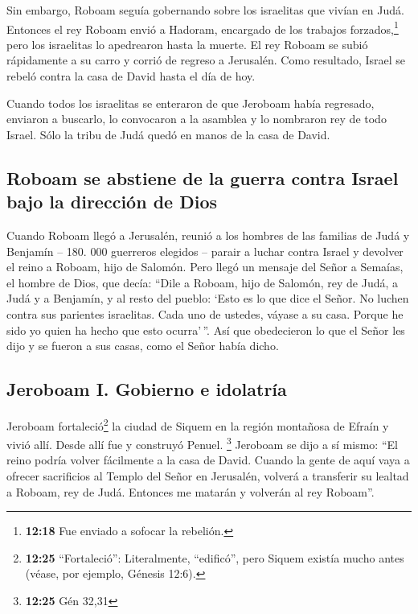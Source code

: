  Sin embargo, Roboam seguía gobernando sobre los
israelitas que vivían en Judá.  Entonces el rey Roboam
envió a Hadoram, encargado de los trabajos forzados,\footnote{\textbf{12:18}
  Fue enviado a sofocar la rebelión.} pero los israelitas lo apedrearon
hasta la muerte. El rey Roboam se subió rápidamente a su carro y corrió
de regreso a Jerusalén.  Como resultado, Israel se rebeló
contra la casa de David hasta el día de hoy.

 Cuando todos los israelitas se enteraron de que Jeroboam
había regresado, enviaron a buscarlo, lo convocaron a la asamblea y lo
nombraron rey de todo Israel. Sólo la tribu de Judá quedó en manos de la
casa de David.

\hypertarget{roboam-se-abstiene-de-la-guerra-contra-israel-bajo-la-direcciuxf3n-de-dios}{%
\subsection{Roboam se abstiene de la guerra contra Israel bajo la
dirección de
Dios}\label{roboam-se-abstiene-de-la-guerra-contra-israel-bajo-la-direcciuxf3n-de-dios}}

 Cuando Roboam llegó a Jerusalén, reunió a los hombres de
las familias de Judá y Benjamín -- 180. 000 guerreros elegidos -- parair
a luchar contra Israel y devolver el reino a Roboam, hijo de Salomón.
 Pero llegó un mensaje del Señor a Semaías, el hombre de
Dios, que decía:  ``Dile a Roboam, hijo de Salomón, rey
de Judá, a Judá y a Benjamín, y al resto del pueblo: 
`Esto es lo que dice el Señor. No luchen contra sus parientes
israelitas. Cada uno de ustedes, váyase a su casa. Porque he sido yo
quien ha hecho que esto ocurra'\,''. Así que obedecieron lo que el Señor
les dijo y se fueron a sus casas, como el Señor había dicho.

\hypertarget{jeroboam-i.-gobierno-e-idolatruxeda}{%
\subsection{Jeroboam I. Gobierno e
idolatría}\label{jeroboam-i.-gobierno-e-idolatruxeda}}

 Jeroboam fortaleció\footnote{\textbf{12:25}
  ``Fortaleció'': Literalmente, ``edificó'', pero Siquem existía mucho
  antes (véase, por ejemplo, Génesis 12:6).} la ciudad de Siquem en la
región montañosa de Efraín y vivió allí. Desde allí fue y construyó
Penuel. \footnote{\textbf{12:25} Gén 32,31}  Jeroboam se
dijo a sí mismo: ``El reino podría volver fácilmente a la casa de David.
 Cuando la gente de aquí vaya a ofrecer sacrificios al
Templo del Señor en Jerusalén, volverá a transferir su lealtad a Roboam,
rey de Judá. Entonces me matarán y volverán al rey Roboam''.

